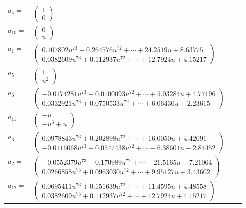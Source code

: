 \documentclass[1p]{elsarticle_modified}
\theoremstyle{definition}
\begin{document}
\begin{tabular}{m{7pt} m{180pt} m{7pt} m{180pt} }
\flushright $a_{4}=$&$\begin{pmatrix}1\\0\end{pmatrix}$ \\
\flushright $a_{10}=$&$\begin{pmatrix}0\\u\end{pmatrix}$ \\
\flushright $a_{1}=$&$\begin{pmatrix}0.107802 u^{73}+0.264576 u^{72}+\cdots+24.2519 u+8.63775\\0.0382609 u^{73}+0.112937 u^{72}+\cdots+12.7924 u+4.15217\end{pmatrix}$ \\
\flushright $a_{5}=$&$\begin{pmatrix}1\\u^2\end{pmatrix}$ \\
\flushright $a_{6}=$&$\begin{pmatrix}-0.0174281 u^{73}+0.0100093 u^{72}+\cdots+5.03284 u+4.77196\\0.0332921 u^{73}+0.0750533 u^{72}+\cdots+6.06430 u+2.23615\end{pmatrix}$ \\
\flushright $a_{11}=$&$\begin{pmatrix}- u\\- u^3+u\end{pmatrix}$ \\
\flushright $a_{3}=$&$\begin{pmatrix}0.0978843 u^{73}+0.202898 u^{72}+\cdots+16.0050 u+4.42091\\-0.0116068 u^{73}-0.0547438 u^{72}+\cdots-6.38601 u-2.84452\end{pmatrix}$ \\
\flushright $a_{2}=$&$\begin{pmatrix}-0.0552379 u^{73}-0.170989 u^{72}+\cdots-21.5165 u-7.21064\\0.0266858 u^{73}+0.0963030 u^{72}+\cdots+9.95127 u+3.43602\end{pmatrix}$ \\
\flushright $a_{12}=$&$\begin{pmatrix}0.0695411 u^{73}+0.151639 u^{72}+\cdots+11.4595 u+4.48558\\0.0382609 u^{73}+0.112937 u^{72}+\cdots+12.7924 u+4.15217\end{pmatrix}$ \\

\end{tabular}
\end{document}
